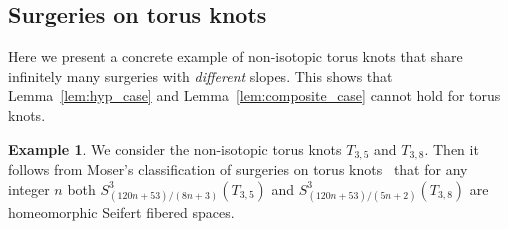 \documentclass{amsart} %
\theoremstyle{thm}
\theoremstyle{definition}
\newtheorem{ex}[Theorem]{Example}
\numberwithin{equation}{section}
\begin{document}
\subsection{Surgeries on torus knots}
Here we present a concrete example of non-isotopic torus knots that share infinitely many surgeries with \textit{different} slopes. This shows that Lemma~\ref{lem:hyp_case} and Lemma~\ref{lem:composite_case} cannot hold for torus knots.

\begin{ex}
We consider the non-isotopic torus knots $T_{3,5}$ and $T_{3,8}$. Then it follows from Moser's classification of surgeries on torus knots~\cite{Moser1971elementary} that for any integer $n$ both $S_{(120n+53)/(8n+3)}^3(T_{3,5})$ and $S_{(120n+53)/(5n+2)}^3(T_{3,8})$ are homeomorphic Seifert fibered spaces.
\end{ex}




\let\MRhref\undefined


\end{document}
